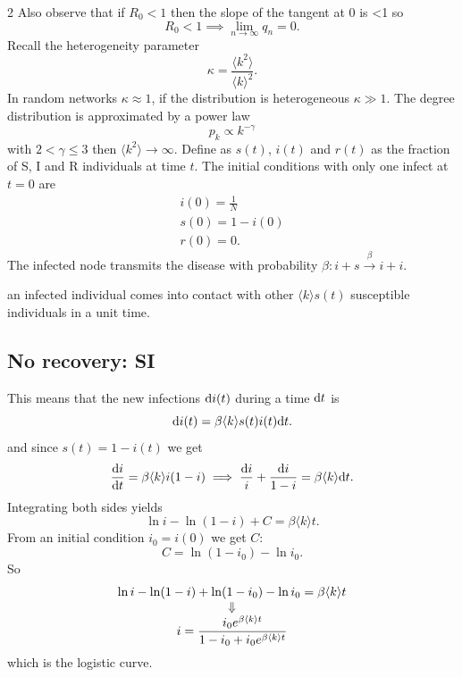 \documentclass[a4paper,9pt]{extarticle}
\begin{document}
\begin{multicols*}{2}
	Also observe that if $R_{0}<1$ then the slope of the tangent at 0 is <1 so
	\begin{equation*}
		R_{0}<1\implies\lim_{n\to\infty}q_{n}=0.
	\end{equation*}
	Recall the heterogeneity parameter
	\begin{equation*}
		\kappa=\frac{\langle k^{2}\rangle}{\langle k\rangle^{2}}.
	\end{equation*}
	In random networks $\kappa\approx 1$, if the distribution is heterogeneous $\kappa\gg1$. The degree distribution is approximated by a power law
	\begin{equation*}
		p_{k}\propto k^{-\gamma}
	\end{equation*}
	with $2<\gamma\leq 3$ then $\langle k^{2}\rangle\to\infty$. Define as $s(t)$, $i(t)$ and $r(t)$ as the fraction of S, I and R individuals at time $t$. The initial conditions with only one infect at $t=0$ are
	\begin{equation*}
		\begin{array}{c}
			i(0)=\frac{1}{N}\\
			s(0)=1-i(0)\\
			r(0)=0.
		\end{array}
	\end{equation*}
	The infected node transmits the disease with probability $\beta:i+s\xrightarrow{\beta}i+i$.
	\begin{riquadro}
		an infected individual comes into contact with other $\langle k\rangle s(t)$
		susceptible individuals in a unit time. 
	\end{riquadro}
	\subsection{No recovery: SI}
	This means that the new infections $\mathrm{d} i(t)$ during a time $\mathrm{d} t$ is
	\begin{equation*}
		\mathrm{d} i(t)=\beta\langle k\rangle s(t)i(t)\mathrm{d} t.
	\end{equation*}
	and since $s(t)=1-i(t)$ we get
	\begin{equation*}
		\frac{\mathrm{d} i}{\mathrm{d} t}=\beta\langle k\rangle i(1-i)\implies\frac{\mathrm{d} i}{i}+\frac{\mathrm{d} i}{1-i}=\beta\langle k\rangle\mathrm{d} t.
	\end{equation*}
	Integrating both sides yields
	\begin{equation*}
		\ln i-\ln(1-i)+C=\beta\langle k\rangle t.
	\end{equation*}
	From an initial condition $i_{0}=i(0)$ we get $C$:
	\begin{equation*}
		C=\ln(1-i_{0})-\ln i_{0}.
	\end{equation*}
	So
	\begin{equation*}
			\begin{array}{>{\displaystyle}c}
				\ln i-\ln(1-i)+\ln(1-i_{0})-\ln i_{0}=\beta\langle k\rangle t\\
				\Downarrow\\
				i=\frac{i_{0}e^{\beta\ang{k}t}}{1-i_{0}+i_{0}e^{\beta\ang{k}{t}}}
			\end{array}
	\end{equation*}
	which is the logistic curve.

\end{multicols*}
\end{document}

